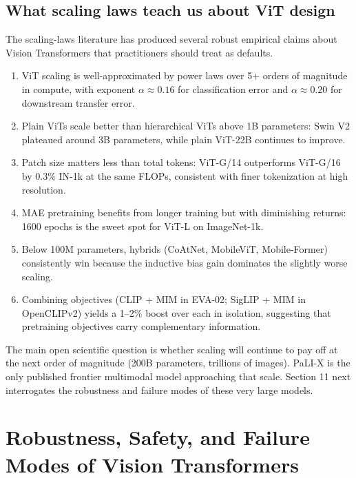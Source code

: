 \documentclass{article}
\begin{document}
\subsection{What scaling laws teach us about ViT design}\label{what-scaling-laws-teach-us-about-vit-design}

The scaling-laws literature has produced several robust empirical claims about Vision Transformers that practitioners should treat as defaults.

\begin{enumerate}
\def\labelenumi{(\roman{enumi})}
\item
  ViT scaling is well-approximated by power laws over 5+ orders of magnitude in compute, with exponent \(\alpha \approx 0.16\) for classification error and \(\alpha \approx 0.20\) for downstream transfer error.
\item
  Plain ViTs scale better than hierarchical ViTs above 1B parameters: Swin V2 plateaued around 3B parameters, while plain ViT-22B continues to improve.
\item
  Patch size matters less than total tokens: ViT-G/14 outperforms ViT-G/16 by 0.3\% IN-1k at the same FLOPs, consistent with finer tokenization at high resolution.
\item
  MAE pretraining benefits from longer training but with diminishing returns: 1600 epochs is the sweet spot for ViT-L on ImageNet-1k.
\item
  Below 100M parameters, hybrids (CoAtNet, MobileViT, Mobile-Former) consistently win because the inductive bias gain dominates the slightly worse scaling.
\item
  Combining objectives (CLIP + MIM in EVA-02; SigLIP + MIM in OpenCLIPv2) yields a 1--2\% boost over each in isolation, suggesting that pretraining objectives carry complementary information.
\end{enumerate}

The main open scientific question is whether scaling will continue to pay off at the next order of magnitude (200B parameters, trillions of images). PaLI-X is the only published frontier multimodal model approaching that scale. Section 11 next interrogates the robustness and failure modes of these very large models.

\section{Robustness, Safety, and Failure Modes of Vision Transformers}\label{robustness-safety-and-failure-modes-of-vision-transformers}
\end{document}

